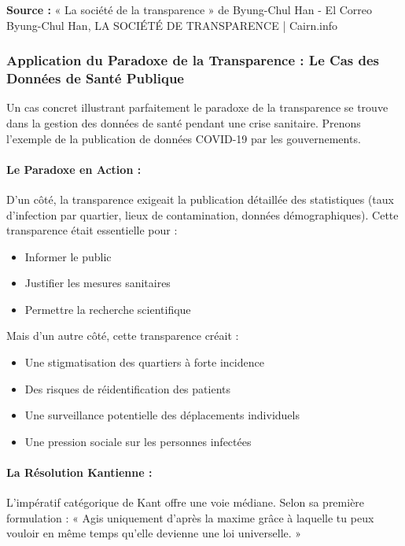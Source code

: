 \documentclass[12pt]{article}
\begin{document}
\textbf{Source :} « La société de la transparence » de Byung-Chul Han - El Correo \\
Byung-Chul Han, LA SOCIÉTÉ DE TRANSPARENCE | Cairn.info

\subsubsection*{Application du Paradoxe de la Transparence : Le Cas des Données de Santé Publique}

Un cas concret illustrant parfaitement le paradoxe de la transparence se trouve dans la gestion des données de santé pendant une crise sanitaire. Prenons l'exemple de la publication de données COVID-19 par les gouvernements.

\paragraph{Le Paradoxe en Action :}
D'un côté, la transparence exigeait la publication détaillée des statistiques (taux d'infection par quartier, lieux de contamination, données démographiques). Cette transparence était essentielle pour :
\begin{itemize}
\item Informer le public
\item Justifier les mesures sanitaires
\item Permettre la recherche scientifique
\end{itemize}

Mais d'un autre côté, cette transparence créait :
\begin{itemize}
\item Une stigmatisation des quartiers à forte incidence
\item Des risques de réidentification des patients
\item Une surveillance potentielle des déplacements individuels
\item Une pression sociale sur les personnes infectées
\end{itemize}

\paragraph{La Résolution Kantienne :}
L'impératif catégorique de Kant offre une voie médiane. Selon sa première formulation : « Agis uniquement d'après la maxime grâce à laquelle tu peux vouloir en même temps qu'elle devienne une loi universelle. »
\end{document}
